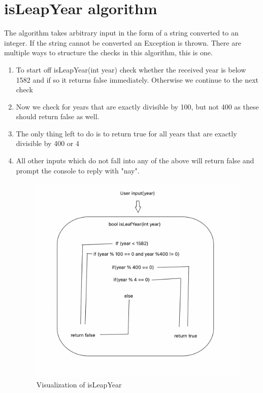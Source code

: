 \documentclass[12pt,letterpaper]{article}
\begin{document}
\section*{isLeapYear algorithm}

The algorithm takes arbitrary input in the form of a string converted to an integer. If the string cannot be converted an Exception is thrown. There are multiple ways to structure the checks in this algorithm, this is one.

\begin{enumerate}
  \item
   To start off isLeapYear(int year) check whether the received year is below 1582 and if so it returns false immediately. Otherwise we continue to the next check
  \item
   Now we check for years that are exactly divisible by 100, but not 400 as these should return false as well.
   
   \item The only thing left to do is to return true for all years that are exactly divisible by 400 or 4
   
   \item All other inputs which do not fall into any of the above will return false and prompt the console to reply with "nay".
    
    
    \begin{figure}[!h]
    \centering
    \includegraphics[width=0.7\linewidth]{Screenshot 2021-09-09 at 15.23.55.png}
    \caption{Visualization of isLeapYear}
    \end{figure}
\end{enumerate}
\end{document}
